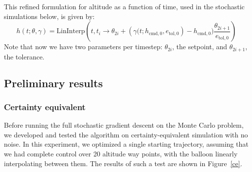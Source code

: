 \documentclass[11pt]{scrartcl} %
\begin{document}
This refined formulation for altitude as a function of time, used in the stochastic simulations below, is given by:
\[h(t; \theta, \gamma) = \text{LinInterp}\left(t, t_i\to\theta_{2i} + \left(\gamma(t; h_{\text{cmd},0}, e_{\text{tol},0}\right)- h_{\text{cmd},0})\frac{\theta_{2i+1}}{e_{\text{tol},0}}\right)\]
Note that now we have two parameters per timestep: $\theta_{2i}$, the setpoint, and $\theta_{2i+1}$, the tolerance.

\subsection{Preliminary results}
\subsubsection{Certainty equivalent}
Before running the full stochastic gradient descent on the Monte Carlo problem, we developed and tested the algorithm on certainty-equivalent simulation with no noise. In this experiment, we optimized a single starting trajectory, assuming that we had complete control over 20 altitude way points, with the balloon linearly interpolating between them. The results of such a test are shown in Figure~\ref{ce}. 
\end{document}
